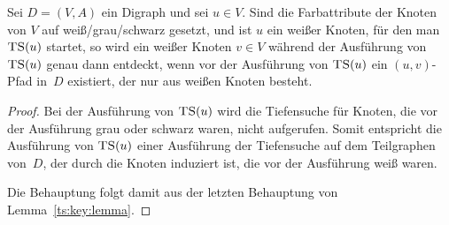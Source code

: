 \begin{kor} \label{kor:weisse:pfade} 
	Sei $D=(V,A)$ ein Digraph und sei $u \in V$.
	Sind die Farbattribute der Knoten von $V$ auf weiß/grau/schwarz gesetzt, und ist $u$ ein weißer Knoten, für den man $\mathop{\text{\textsc{TS}}}(u)$ startet, so wird ein weißer Knoten $v \in V$ während der Ausführung von $\mathop{\text{\textsc{TS}}}(u)$ genau dann entdeckt, wenn vor der Ausführung von $\mathop{\text{\textsc{TS}}}(u)$ ein $(u,v)$-Pfad in~$D$ existiert, der nur aus weißen Knoten besteht. 
\end{kor} 
\begin{proof}
	Bei der Ausführung von $\mathop{\text{\textsc{TS}}}(u)$ wird die Tiefensuche für Knoten, die vor der Ausführung grau oder schwarz waren, nicht aufgerufen. Somit entspricht die Ausführung von $\mathop{\text{\textsc{TS}}}(u)$ einer Ausführung der Tiefensuche auf dem Teilgraphen von~$D$, der durch die Knoten induziert ist, die vor der Ausführung weiß waren.
	
	Die Behauptung folgt damit aus der letzten Behauptung von Lemma~\ref{ts:key:lemma}. 
\end{proof} 


